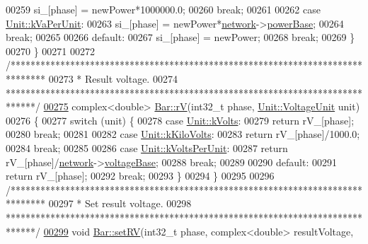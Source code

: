 \begin{DoxyCode}
00259     si\_[phase] = newPower*1000000.0;
00260     \textcolor{keywordflow}{break};
00261 
00262   \textcolor{keywordflow}{case} \hyperlink{class_unit_ace265ae255370ccacfd5370337572c3bae056e80d620a87c61a44c359e6b05cc1}{Unit::kVaPerUnit}:
00263     si\_[phase] = newPower*\hyperlink{class_bar_a80025f13884750add58cc61b318357ff}{network}->\hyperlink{group___graphics_ga74bb7aa495d422f1f092acdf958df989}{powerBase};
00264     \textcolor{keywordflow}{break};
00265 
00266   \textcolor{keywordflow}{default}:
00267     si\_[phase] = newPower;
00268     \textcolor{keywordflow}{break};
00269   \}
00270 \}
00271 
00272 \textcolor{comment}{/*******************************************************************************}
00273 \textcolor{comment}{ * Result voltage.}
00274 \textcolor{comment}{ ******************************************************************************/}
\hypertarget{bar_8cpp_source_l00275}{}\hyperlink{group___models_ga2d1f6bfbd8abaf168bb75bd8e5cd9b5e}{00275} complex<double> \hyperlink{group___models_ga2d1f6bfbd8abaf168bb75bd8e5cd9b5e}{Bar::rV}(int32\_t phase, \hyperlink{class_unit_a55b07dfa9457e1eca2c7194fe0cfc3c1}{Unit::VoltageUnit} unit)
00276 \{
00277   \textcolor{keywordflow}{switch} (unit) \{
00278   \textcolor{keywordflow}{case} \hyperlink{class_unit_a55b07dfa9457e1eca2c7194fe0cfc3c1aa54b2473993a702a3923525765bd6e4c}{Unit::kVolts}:
00279     \textcolor{keywordflow}{return} rV\_[phase];
00280     \textcolor{keywordflow}{break};
00281 
00282   \textcolor{keywordflow}{case} \hyperlink{class_unit_a55b07dfa9457e1eca2c7194fe0cfc3c1a35a201a658c2cd89766787c657e9a54d}{Unit::kKiloVolts}:
00283     \textcolor{keywordflow}{return} rV\_[phase]/1000.0;
00284     \textcolor{keywordflow}{break};
00285 
00286   \textcolor{keywordflow}{case} \hyperlink{class_unit_a55b07dfa9457e1eca2c7194fe0cfc3c1ab44b1310b59fdcdc9df5bbea91da4206}{Unit::kVoltsPerUnit}:
00287     \textcolor{keywordflow}{return} rV\_[phase]/\hyperlink{class_bar_a80025f13884750add58cc61b318357ff}{network}->\hyperlink{group___graphics_ga7c1e79d9ac69df9a69f24eaf092fd5e5}{voltageBase};
00288     \textcolor{keywordflow}{break};
00289 
00290   \textcolor{keywordflow}{default}:
00291     \textcolor{keywordflow}{return} rV\_[phase];
00292     \textcolor{keywordflow}{break};
00293   \}
00294 \}
00295 
00296 \textcolor{comment}{/*******************************************************************************}
00297 \textcolor{comment}{ * Set result voltage.}
00298 \textcolor{comment}{ ******************************************************************************/}
\hypertarget{bar_8cpp_source_l00299}{}\hyperlink{group___models_ga2b2c5a373d87025e79d26aa9c4cea75a}{00299} \textcolor{keywordtype}{void} \hyperlink{group___models_ga2b2c5a373d87025e79d26aa9c4cea75a}{Bar::setRV}(int32\_t phase, complex<double> resultVoltage,

\end{DoxyCode}
